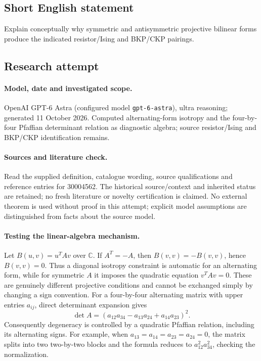 \documentclass[11pt]{article}
\begin{document}
\subsection{Short English statement}
Explain conceptually why symmetric and antisymmetric projective bilinear forms produce the indicated resistor/Ising and BKP/CKP pairings.
\subsection{Research attempt}
\paragraph{Model, date and investigated scope.}
OpenAI GPT-6 Astra (configured model \texttt{gpt-6-astra}), ultra reasoning; generated 11 October 2026. Computed alternating-form isotropy and the four-by-four Pfaffian determinant relation as diagnostic algebra; source resistor/Ising and BKP/CKP identification remains.

\paragraph{Sources and literature check.}
Read the supplied definition, catalogue wording, source qualifications and reference entries for 30004562. The historical source/context and inherited status are retained; no fresh literature or novelty certification is claimed. No external theorem is used without proof in this attempt; explicit model assumptions are distinguished from facts about the source model.

\paragraph{Testing the linear-algebra mechanism.} Let \(B(u,v)=u^TAv\) over \(\mathbb C\). If \(A^T=-A\), then \(B(v,v)=-B(v,v)\), hence \(B(v,v)=0\). Thus a diagonal isotropy constraint is automatic for an alternating form, while for symmetric \(A\) it imposes the quadratic equation \(v^TAv=0\). These are genuinely different projective conditions and cannot be exchanged simply by changing a sign convention.
For a four-by-four alternating matrix with upper entries \(a_{ij}\), direct determinant expansion gives
\[
 \det A=(a_{12}a_{34}-a_{13}a_{24}+a_{14}a_{23})^2.
\]
Consequently degeneracy is controlled by a quadratic Pfaffian relation, including its alternating signs. For example, when \(a_{13}=a_{14}=a_{23}=a_{24}=0\), the matrix splits into two two-by-two blocks and the formula reduces to \(a_{12}^2a_{34}^2\), checking the normalization.
\end{document}
